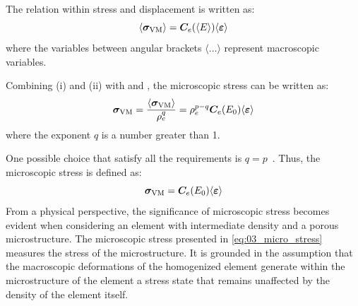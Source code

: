 The relation within stress and displacement is written as:
\begin{equation}
    \langle \bm{\sigma}_{\text{VM}} \rangle = \bm{C}_e(\langle E \rangle) \langle \bm{\varepsilon} \rangle
    \label{eq:03_stress_disp}
\end{equation}
where the variables between angular brackets $\langle \dots \rangle$ represent macroscopic variables.

Combining (i) and (ii) with  and , the microscopic stress can be written as:
\begin{equation}
    \bm{\sigma}_{\text{VM}} = \frac{\langle \bm{\sigma}_{\text{VM}} \rangle}{\rho^q_e} = \rho_e^{p-q} \bm{C}_e(E_0)\langle \bm{\varepsilon} \rangle
\end{equation}
where the exponent $q$ is a number greater than 1.

One possible choice that satisfy all the requirements is $q=p$~. Thus, the microscopic stress is defined as:
\begin{equation}
    \bm{\sigma}_{\text{VM}} = \bm{C}_e(E_0)\langle \bm{\varepsilon} \rangle
    \label{eq:03_micro_stress}
\end{equation}
From a physical perspective, the significance of microscopic stress becomes evident when considering an element with intermediate density and a porous microstructure. The microscopic stress presented in \eqref{eq:03_micro_stress} measures the stress of the microstructure. It is grounded in the assumption that the macroscopic deformations of the homogenized element generate within the microstructure of the element a stress state that remains unaffected by the density of the element itself.

